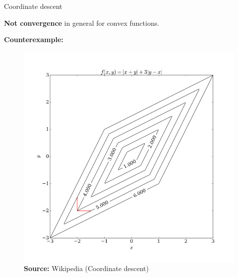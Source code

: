 \documentclass[11pt,compress,t,notes=noshow, xcolor=table]{beamer}
\begin{document}
\begin{vbframe}{Coordinate descent}
\framebreak

\textbf{Not convergence} in general for convex functions.

\medskip

\textbf{Counterexample:}

\begin{figure}
    \centering
    \includegraphics[height=0.6\textheight,keepaspectratio]{figure_man/Nonsmooth_coordinate_descent.png}
    \caption*{\small \textbf{Source:} Wikipedia (Coordinate descent)}
\end{figure}




%
%



\end{vbframe}
\end{document}
